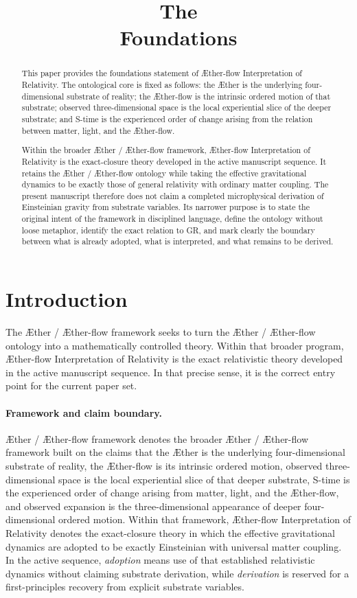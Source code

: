 \documentclass[11pt]{article}
\title{\textbf{The \TheoryName{}}\\[0.4em]
\large Foundations}
\author{}
\date{}
\newcommand{\Aether}{\AE{}ther}
\newcommand{\Aflow}{\AE{}ther-flow}
\newcommand{\TheoryName}{\Aflow{} Interpretation of Relativity}
\newcommand{\TheoryProgram}{\Aether{} / \Aflow{} framework}
\begin{document}
\maketitle

\begin{abstract}
This paper provides the foundations statement of \TheoryName{}. The ontological core is fixed as follows: the \Aether{} is the underlying four-dimensional substrate of reality; the \Aflow{} is the intrinsic ordered motion of that substrate; observed three-dimensional space is the local experiential slice of the deeper substrate; and S-time is the experienced order of change arising from the relation between matter, light, and the \Aflow{}.

Within the broader \TheoryProgram{}, \TheoryName{} is the exact-closure theory developed in the active manuscript sequence. It retains the \Aether{} / \Aflow{} ontology while taking the effective gravitational dynamics to be exactly those of general relativity with ordinary matter coupling. The present manuscript therefore does not claim a completed microphysical derivation of Einsteinian gravity from substrate variables. Its narrower purpose is to state the original intent of the framework in disciplined language, define the ontology without loose metaphor, identify the exact relation to GR, and mark clearly the boundary between what is already adopted, what is interpreted, and what remains to be derived.
%
\end{abstract}

\section{Introduction}

The \TheoryProgram{} seeks to turn the \Aether{} / \Aflow{} ontology into a mathematically controlled theory. Within that broader program, \TheoryName{} is the exact relativistic theory developed in the active manuscript sequence. In that precise sense, it is the correct entry point for the current paper set.

\paragraph{Framework and claim boundary.}
\TheoryProgram{} denotes the broader \Aether{} / \Aflow{} framework built on the claims that the \Aether{} is the underlying four-dimensional substrate of reality, the \Aflow{} is its intrinsic ordered motion, observed three-dimensional space is the local experiential slice of that deeper substrate, S-time is the experienced order of change arising from matter, light, and the \Aflow{}, and observed expansion is the three-dimensional appearance of deeper four-dimensional ordered motion. Within that framework, \TheoryName{} denotes the exact-closure theory in which the effective gravitational dynamics are adopted to be exactly Einsteinian with universal matter coupling. In the active sequence, \emph{adoption} means use of that established relativistic dynamics without claiming substrate derivation, while \emph{derivation} is reserved for a first-principles recovery from explicit substrate variables.
\end{document}
